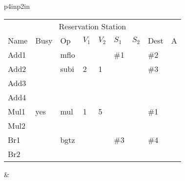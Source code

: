 \begin{tabular}{p{4in}p{2in}}
\noindent
\begin{tabular}{lllllllll}
\multicolumn{9}{c}{Reservation Station} \\
Name & Busy & Op   & $V_1$ & $V_2$ & $S_1$ & $S_2$ & Dest & A \\ \hline
Add1 &      & mflo &       &       & \#1   &       & \#2  &   \\
Add2 &      & subi & 2     & 1     &       &       & \#3  &   \\
Add3 &      &      &       &       &       &       &      &   \\
Add4 &      &      &       &       &       &       &      &   \\ \hline
Mul1 & yes  & mul  & 1     & 5     &       &       & \#1  &   \\
Mul2 &      &      &       &       &       &       &      &   \\ \hline
Br1  &      & bgtz &       &       & \#3   &       & \#4  &   \\
Br2  &      &      &       &       &       &       &      &   \\
\end{tabular} &  \\
\end{tabular}






